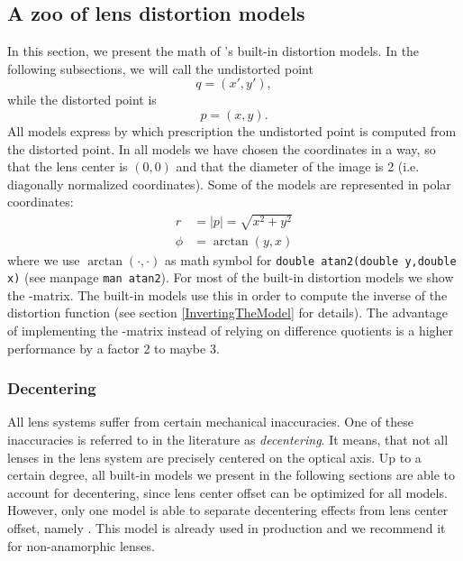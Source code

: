 \documentclass[10pt,a4paper]{article}
\newcommand{\norm}[1]{\left|#1\right|}
\begin{document}
\subsection{A zoo of lens distortion models}
In this section, we present the math of \tde's built-in distortion models.
In the following subsections, we will call the undistorted point
\begin{equation}
q = (x',y'),
\end{equation}
while the distorted point is
\begin{equation}
p = (x,y).
\end{equation}
All models express by which prescription the undistorted
point is computed from the distorted point. In all models we have
chosen the coordinates in a way, so that the lens center is $(0,0)$
and that the diameter of the image is 2 (i.e. diagonally normalized coordinates).
Some of the models are represented in polar coordinates:
\begin{align}
r &= \norm{p} = \sqrt{x^2 + y^2}\nonumber\\
\phi &= \arctan(y,x)
\end{align}
where we use $\arctan(\cdot,\cdot)$ as math symbol for {\tt double atan2(double y,double x)}
(see manpage {\tt man atan2}).
For most of the built-in distortion models we show the \Jacobi-matrix.
The built-in models use this in order to compute the inverse of the
distortion function (see section \ref{InvertingTheModel} for details).
The advantage of implementing the \Jacobi-matrix instead of relying on difference quotients
is a higher performance by a factor 2 to maybe 3.
\subsubsection{Decentering}
All lens systems suffer from certain mechanical inaccuracies.
One of these inaccuracies is referred to in the literature as {\em decentering}.
It means, that not all lenses in the lens system are precisely centered on the optical axis.
Up to a certain degree, all built-in models we present in the following sections
are able to account for decentering, since lens center offset can be optimized for all models.
However, only one model is able to separate decentering effects from lens center offset, namely
. This model is already used in production
and we recommend it for non-anamorphic lenses.
\end{document}
